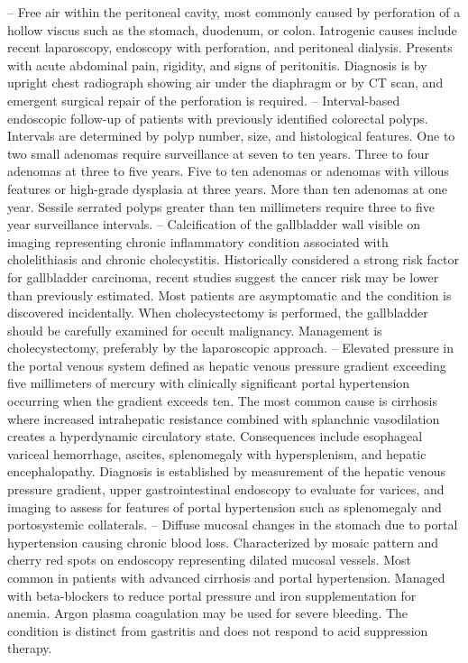 -- Free air within the peritoneal cavity, most commonly caused by perforation of a hollow viscus such as the stomach, duodenum, or colon. Iatrogenic causes include recent laparoscopy, endoscopy with perforation, and peritoneal dialysis. Presents with acute abdominal pain, rigidity, and signs of peritonitis. Diagnosis is by upright chest radiograph showing air under the diaphragm or by CT scan, and emergent surgical repair of the perforation is required.
-- Interval-based endoscopic follow-up of patients with previously identified colorectal polyps. Intervals are determined by polyp number, size, and histological features. One to two small adenomas require surveillance at seven to ten years. Three to four adenomas at three to five years. Five to ten adenomas or adenomas with villous features or high-grade dysplasia at three years. More than ten adenomas at one year. Sessile serrated polyps greater than ten millimeters require three to five year surveillance intervals.
-- Calcification of the gallbladder wall visible on imaging representing chronic inflammatory condition associated with cholelithiasis and chronic cholecystitis. Historically considered a strong risk factor for gallbladder carcinoma, recent studies suggest the cancer risk may be lower than previously estimated. Most patients are asymptomatic and the condition is discovered incidentally. When cholecystectomy is performed, the gallbladder should be carefully examined for occult malignancy. Management is cholecystectomy, preferably by the laparoscopic approach.
-- Elevated pressure in the portal venous system defined as hepatic venous pressure gradient exceeding five millimeters of mercury with clinically significant portal hypertension occurring when the gradient exceeds ten. The most common cause is cirrhosis where increased intrahepatic resistance combined with splanchnic vasodilation creates a hyperdynamic circulatory state. Consequences include esophageal variceal hemorrhage, ascites, splenomegaly with hypersplenism, and hepatic encephalopathy. Diagnosis is established by measurement of the hepatic venous pressure gradient, upper gastrointestinal endoscopy to evaluate for varices, and imaging to assess for features of portal hypertension such as splenomegaly and portosystemic collaterals.
-- Diffuse mucosal changes in the stomach due to portal hypertension causing chronic blood loss. Characterized by mosaic pattern and cherry red spots on endoscopy representing dilated mucosal vessels. Most common in patients with advanced cirrhosis and portal hypertension. Managed with beta-blockers to reduce portal pressure and iron supplementation for anemia. Argon plasma coagulation may be used for severe bleeding. The condition is distinct from gastritis and does not respond to acid suppression therapy.
